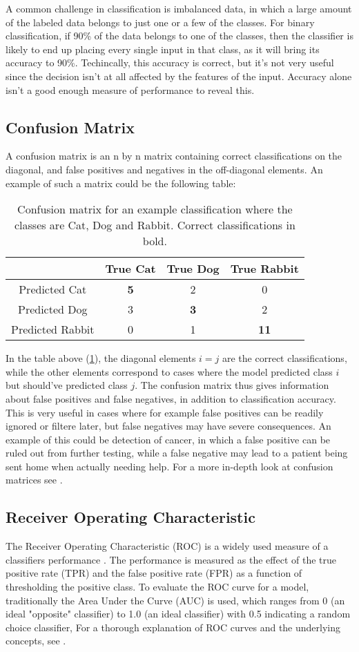 A common challenge in classification is imbalanced data, in which a large
amount of the labeled data belongs to just one or a few of the classes.
For binary classification, if 90\% of the data belongs to one of the classes,
then the classifier is likely to end up placing every single
input in that class, as it will bring its accuracy to 90\%. Techincally, this
accuracy is correct, but it's not very useful since the decision isn't at all
affected by the features of the input. Accuracy alone isn't a good enough
measure of performance to reveal this.

\subsection{Confusion Matrix}
A confusion matrix is an n by n matrix containing correct classifications
on the diagonal, and false positives and negatives in the off-diagonal elements.
An example of such a matrix could be the following table:
\begin{table}[h]
    \centering
    \begin{tabular}{c|c|c|c}
     & True Cat & True Dog & True Rabbit \\
    \hline
    Predicted Cat & \textbf{5} & 2 & 0 \\
    \hline
    Predicted Dog & 3 & \textbf{3} & 2 \\
    \hline
    Predicted Rabbit & 0 & 1 & \textbf{11} \\
\end{tabular}
\caption{Confusion matrix for an example classification where the classes
         are Cat, Dog and Rabbit. Correct classifications in bold.}
\label{tab:confmat-example}
\end{table}
In the table above (\ref{tab:confmat-example}), the diagonal elements
$i = j$ are the correct classifications, while the other elements correspond
to cases where the model predicted class $i$ but should've predicted class $j$.
The confusion matrix thus gives information about false positives and false
negatives, in addition to classification accuracy. This is very useful
in cases where for example false positives can be readily ignored or filtere
later, but false negatives may have severe consequences. An example of this
could be detection of cancer, in which a false positive can be ruled out
from further testing, while a false negative may lead to a patient being sent
home when actually needing help. For a more in-depth look at confusion matrices
see \cite{Fawcett2006}.

\subsection{Receiver Operating Characteristic}
The Receiver Operating Characteristic (ROC) is a widely used measure of a
classifiers performance . The performance is measured as the effect
of the true positive rate (TPR) and the false positive rate (FPR) as a function
of thresholding the positive class. To evaluate the ROC curve for a model,
traditionally the Area Under the Curve (AUC) is used, which ranges from 0
(an ideal "opposite" classifier) to 1.0 (an ideal classifier) with 0.5
indicating a random choice classifier,
For a thorough explanation of ROC curves and the underlying concepts, see \cite{Fawcett2006}.
